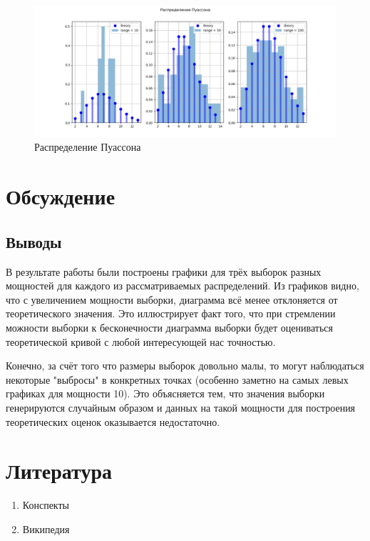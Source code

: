 \documentclass[12pt]{article}
\begin{document}
\pagebreak

\begin{figure}[h!]
\begin{center}
\includegraphics[width=\textwidth]{poisson.png}
\caption{Распределение Пуассона}
\end{center}
\end{figure}

\section{Обсуждение}

\subsection{Выводы}
В результате работы были построены графики для трёх выборок разных мощностей для каждого из рассматриваемых распределений. Из графиков видно, что с увеличением мощности выборки, диаграмма всё менее отклоняется от теоретического значения. Это иллюстрирует факт того, что при стремлении можности выборки к бесконечности диаграмма выборки будет оцениваться теоретической кривой с любой интересующей нас точностью.
\par
Конечно, за счёт того что размеры выборок довольно малы, то могут наблюдаться некоторые "выбросы" в конкретных точках (особенно заметно на самых левых графиках для мощности 10). Это объясняется тем, что значения выборки генерируются случайным образом и данных на такой мощности для построения теоретических оценок оказывается недостаточно.


\section{Литература}
\begin{enumerate}
\item Конспекты
\item Википедия
\end{enumerate}
\end{document}
